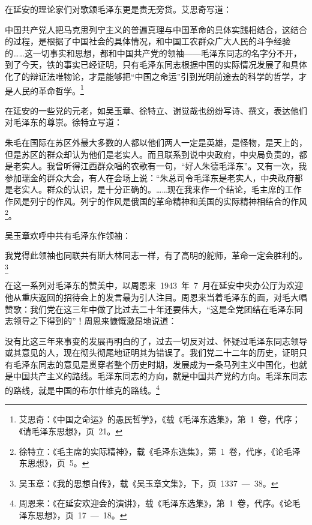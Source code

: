 在延安的理论家们对歌颂毛泽东更是责无旁贷。艾思奇写道：

\begin{quoting}
中国共产党人把马克思列宁主义的普遍真理与中国革命的具体实践相结合，这结合的过程，是根据了中国社会的具体情况，和中国工农群众广大人民的斗争经验的……这一切事实和思想，都和中国共产党的领袖——毛泽东同志的名字分不开，到了今天，铁的事实已经证明，只有毛泽东同志根据中国的实际情况发展了和具体化了的辩证法唯物论，才是能够把“中国之命运”引到光明前途去的科学的哲学，才是人民的革命哲学。\footnote{艾思奇：《中国之命运》的愚民哲学》，《载《毛泽东选集》，第~1~卷，代序；《请毛泽东思想》，页~21。}
\end{quoting}

在延安的一些党的元老，如吴玉章、徐特立、谢觉哉也纷纷写诗、撰文，表达他们对毛泽东的尊崇。徐特立写道：

\begin{quoting}
朱毛在国际在苏区外最大多数的人都以他们两人一定是英雄，是怪物，是天上的，但是苏区的群众却认为他们是老实人。而且联系到说中央政府，中央局负责的，都是老实人。我曾听得江西群众唱的农歌有一句，“好人朱德毛泽东”。又有一次，我参加瑞金的群众大会，有人在会场上说：“朱总司令毛泽东是老实人，中央政府都是老实人。群众的认识，是十分正确的。……现在我来作一个结论，毛主席的工作作风是列宁的作风。列宁的作风是俄国的革命精神和美国的实际精神相结合的作风\footnote{徐特立：《毛主席的实际精神》，载《毛泽东选集》，第~1~卷，代序，《论毛泽东思想》，页~5。}。
\end{quoting}

吴玉章欢呼中共有毛泽东作领袖：

\begin{quoting}
我党得此领袖也同联共有斯大林同志一样，有了高明的舵师，革命一定会胜利的。\footnote{吴玉章：《我的思想自传》，载《吴玉章文集》，下，页~1337~—~38。}
\end{quoting}

在这一系列对毛泽东的赞美中，以周恩来~1943~年~7~月在延安中央办公厅为欢迎他从重庆返回的招待会上的发言最为引人注目。周恩来当着毛泽东的面，对毛大唱赞歌：我们党在这三年中做了比过去二十年还要伟大，“这是全党团结在毛泽东同志领导之下得到的”！周恩来慷慨激昂地说道：

\begin{quoting}
没有比这三年来事变的发展再明白的了，过去一切反对过、怀疑过毛泽东同志领导或其意见的人，现在彻头彻尾地证明其为错误了。我们党二十二年的历史，证明只有毛泽东同志的意见是贯穿者整个历史时期，发展成为一条马列主义中国化，也就是中国共产主义的路线。毛泽东同志的方向，就是中国共产党的方向。毛泽东同志的路线，就是中国的布尔什维克的路线。\footnote{周恩来：《在延安欢迎会的演讲》，载《毛泽东选集》，第~1~卷，代序。《论毛泽东思想》，页~17~—~18。}
\end{quoting}

